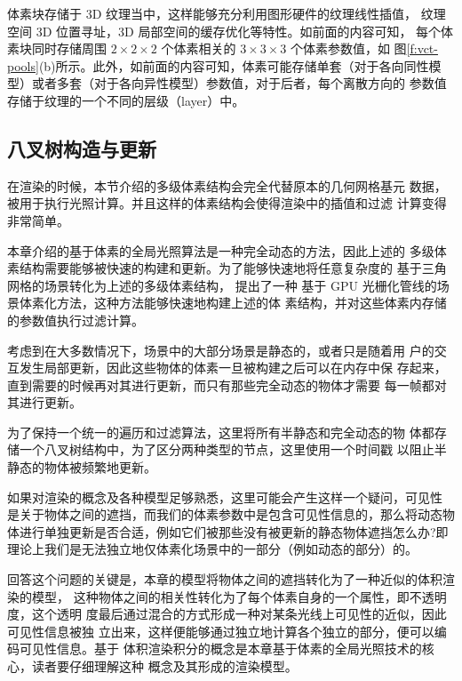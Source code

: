 体素块存储于 3D 纹理当中，这样能够充分利用图形硬件的纹理线性插值， 纹理空间 3D 位置寻址，3D 局部空间的缓存优化等特性。如前面的内容可知， 每个体素块同时存储周围 $2\times 2\times 2$ 个体素相关的 $3\times 3\times 3$ 个体素参数值，如 图\ref{f:vct-pools}(b)所示。此外，如前面的内容可知，体素可能存储单套（对于各向同性模型）或者多套（对于各向异性模型）参数值，对于后者，每个离散方向的 参数值存储于纹理的一个不同的层级（layer）中。




\subsection{八叉树构造与更新}\label{sec:vct-octree-build-and-update}
在渲染的时候，本节介绍的多级体素结构会完全代替原本的几何网格基元 数据，被用于执行光照计算。并且这样的体素结构会使得渲染中的插值和过滤 计算变得非常简单。

本章介绍的基于体素的全局光照算法是一种完全动态的方法，因此上述的 多级体素结构需要能够被快速的构建和更新。为了能够快速地将任意复杂度的 基于三角网格的场景转化为上述的多级体素结构，\cite{a:Gigavoxels:Avoxelbasedrenderingpipelineforefficientexplorationoflargeanddetailedscenes} 提出了一种 基于 GPU 光栅化管线的场景体素化方法，这种方法能够快速地构建上述的体 素结构，并对这些体素内存储的参数值执行过滤计算。

考虑到在大多数情况下，场景中的大部分场景是静态的，或者只是随着用 户的交互发生局部更新，因此这些物体的体素一旦被构建之后可以在内存中保 存起来，直到需要的时候再对其进行更新，而只有那些完全动态的物体才需要 每一帧都对其进行更新。

为了保持一个统一的遍历和过滤算法，这里将所有半静态和完全动态的物 体都存储一个八叉树结构中，为了区分两种类型的节点，这里使用一个时间戳 以阻止半静态的物体被频繁地更新。

\begin{myshaded}
	如果对渲染的概念及各种模型足够熟悉，这里可能会产生这样一个疑问，可见性 是关于物体之间的遮挡，而我们的体素参数中是包含可见性信息的，那么将动态物 体进行单独更新是否合适，例如它们被那些没有被更新的静态物体遮挡怎么办?即 理论上我们是无法独立地仅体素化场景中的一部分（例如动态的部分）的。
	
	回答这个问题的关键是，本章的模型将物体之间的遮挡转化为了一种近似的体积渲染的模型， 这种物体之间的相关性转化为了每个体素自身的一个属性，即不透明度，这个透明 度最后通过混合的方式形成一种对某条光线上可见性的近似，因此可见性信息被独 立出来，这样便能够通过独立地计算各个独立的部分，便可以编码可见性信息。基于 体积渲染积分的概念是本章基于体素的全局光照技术的核心，读者要仔细理解这种 概念及其形成的渲染模型。
\end{myshaded}



